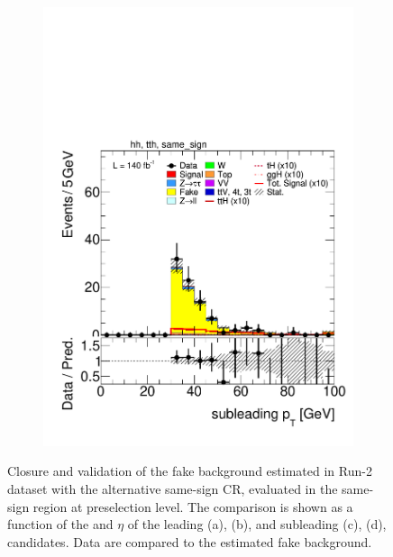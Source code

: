 \begin{figure}[htbp]
\begin{subfigure}[b]{0.45\textwidth}
      \includegraphics[width=\textwidth]{images/same_sign_same_sign_run2/plot_tau_1_pt_hh_tth_15_16_17_18_same_sign.pdf}
      \caption{}
    \end{subfigure}

    \caption{
    Closure and validation of the fake background estimated in Run-2 dataset with the alternative same-sign \tauhadhad CR, evaluated in the same-sign region at preselection level.
    The comparison is shown as a function of the \pt and $\eta$ of the leading (a), (b), and subleading (c), (d), \tauhad candidates. 
    Data are compared to the estimated fake background.
  }
  \label{fig:closure_validation_same_sign_run2}
\end{figure}

